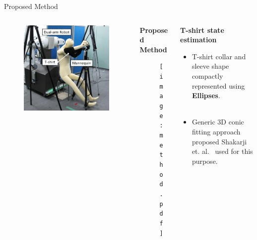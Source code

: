 \documentclass[final,hyperref={pdfpagelabels=false}]{beamer}
\begin{document}
\begin{frame}[t]
\begin{columns}[t]
\begin{column}{0.96\linewidth}
\begin{alertblock}{Proposed Method}
\begin{columns}[t]
\begin{column}{0.24\linewidth}
\begin{figure}
\centering
\includegraphics[width=\textwidth]{setup.png}
\end{figure}

\end{column}

\begin{column}{0.48\linewidth}

\centering \textbf{Proposed Method}

\begin{figure}
\centering
\texttt{[image: method.pdf]}
\end{figure}

\end{column}

\begin{column}{0.24\linewidth}

\centering \textbf{T-shirt state estimation}

\vspace{3mm}

\begin{itemize}
\item T-shirt collar and sleeve shape compactly represented using \textbf{Ellipses}.\\~\\
\item Generic 3D conic fitting approach proposed Shakarji et. al.~\cite{ellipse} used for this purpose.
\end{itemize}


\end{column}
\end{columns}
\end{alertblock}
\end{column}
\end{columns}
\end{frame}
\end{document}
